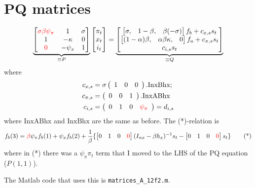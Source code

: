 \documentclass[11pt]{article}
\renewcommand{\[}{\begin{equation}}
\renewcommand{\]}{\end{equation}}
\begin{document}
\section{PQ matrices}
\begin{equation}
\underbrace{\begin{bmatrix} \textcolor{red}{\sigma\beta\psi_{\pi}} & 1&  \sigma \\ 1& -\kappa & 0 \\ \textcolor{red}{0}  & -\psi_{x} & 1 \end{bmatrix}}_{\equiv P}\begin{bmatrix} \pi_t \\ x_t \\i_t \end{bmatrix} = \underbrace{\begin{bmatrix} \begin{bmatrix}\sigma, &1-\beta, &\beta  (-\sigma )\end{bmatrix}f_b +c_{x,s} s_t \\ \begin{bmatrix}(1-\alpha ) \beta ,&\alpha  \beta  \kappa ,&0\end{bmatrix}f_a +c_{\pi,s} s_t \\ c_{i,s} s_t \end{bmatrix}}_{\equiv Q}
\end{equation}
where 
\begin{align}
c_{x,s} & = \sigma  \left(
\begin{array}{ccc}
 1 & 0 & 0 \\
\end{array}
\right).\text{InxBhx};\\
c_{\pi,s} & = \left(
\begin{array}{ccc}
 0 & 0 & 1 \\
\end{array}
\right).\text{InxABhx}\\
c_{i,s} & = \left(
\begin{array}{cccc}
 0 & 1 & 0 &\textcolor{red}{\psi_{\pi}} \\
\end{array}
\right) = d_{i,s}
\end{align}
where $\text{InxABhx}$ and $\text{InxBhx}$ are the same as before.
The (*)-relation is
\begin{equation}
f_b(3) = \textcolor{red}{\beta}\psi_{\pi}f_b(1) + \psi_{x}f_b(2) + \frac{1}{\beta}\{ \begin{bmatrix} 0 &1 & 0 & \textcolor{red}{0}  \end{bmatrix}(I_{nx}-\beta h_x)^{-1} s_t - \begin{bmatrix} 0&1 & 0 & \textcolor{red}{0} \end{bmatrix}s_t  \} \tag{*}
\end{equation}
where in (*) there was a $\psi_{\pi}\pi_t$ term that I moved to the LHS of the PQ equation ($P(1,1)$).

The Matlab code that uses this is \texttt{matrices\_A\_12f2.m}.
\end{document}
